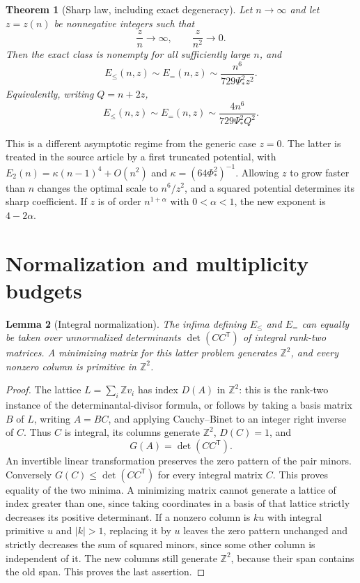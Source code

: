 \documentclass[11pt]{article}
\newtheorem{theorem}{Theorem}[section]
\newtheorem{lemma}[theorem]{Lemma}
\theoremstyle{remark}\newtheorem{remark}[theorem]{Remark}
\newcommand{\Z}{\mathbb Z}\newcommand{\R}{\mathbb R}\newcommand{\N}{\mathbb N}
\begin{document}
\begin{theorem}[Sharp law, including exact degeneracy]\label{thm:main}
Let $n\to\infty$ and let $z=z(n)$ be nonnegative integers such that
\[
 \frac{z}{n}\longrightarrow\infty,\qquad \frac{z}{n^2}\longrightarrow0.
\]
Then the exact class is nonempty for all sufficiently large $n$, and
\[
 E_{\le}(n,z)\sim E_{=}(n,z)\sim
 \frac{n^6}{729\Psi_*^2z^2}.
\]
Equivalently, writing $Q=n+2z$,
\[
 E_{\le}(n,z)\sim E_{=}(n,z)\sim
 \frac{4n^6}{729\Psi_*^2Q^2}.
\]
\end{theorem}

This is a different asymptotic regime from the generic case $z=0$. The latter is treated in the source article by a first truncated potential, with $E_2(n)=\kappa(n-1)^4+O(n^2)$ and $\kappa=(64\Phi_*^2)^{-1}$. Allowing $z$ to grow faster than $n$ changes the optimal scale to $n^6/z^2$, and a squared potential determines its sharp coefficient. If $z$ is of order $n^{1+\alpha}$ with $0<\alpha<1$, the new exponent is $4-2\alpha$.

\section{Normalization and multiplicity budgets}
\begin{lemma}[Integral normalization]\label{lem:normalization}
The infima defining $E_{\le}$ and $E_=$ can equally be taken over unnormalized determinants $\det(CC^{\mathsf T})$ of integral rank-two matrices. A minimizing matrix for this latter problem generates $\Z^2$, and every nonzero column is primitive in $\Z^2$.
\end{lemma}
\begin{proof}
The lattice $L=\sum_i\Z v_i$ has index $D(A)$ in $\Z^2$: this is the rank-two instance of the determinantal-divisor formula, or follows by taking a basis matrix $B$ of $L$, writing $A=BC$, and applying Cauchy--Binet to an integer right inverse of $C$. Thus $C$ is integral, its columns generate $\Z^2$, $D(C)=1$, and
\[
 G(A)=\det(CC^{\mathsf T}).
\]
An invertible linear transformation preserves the zero pattern of the pair minors. Conversely $G(C)\le\det(CC^{\mathsf T})$ for every integral matrix $C$. This proves equality of the two minima. A minimizing matrix cannot generate a lattice of index greater than one, since taking coordinates in a basis of that lattice strictly decreases its positive determinant. If a nonzero column is $k u$ with integral primitive $u$ and $|k|>1$, replacing it by $u$ leaves the zero pattern unchanged and strictly decreases the sum of squared minors, since some other column is independent of it. The new columns still generate $\Z^2$, because their span contains the old span. This proves the last assertion.
\end{proof}
\end{document}

